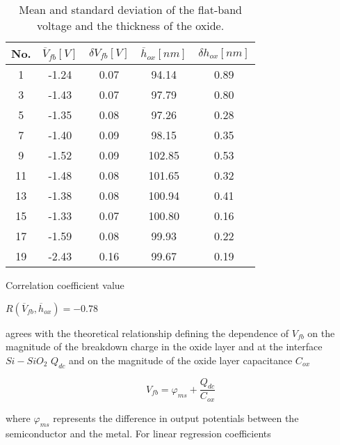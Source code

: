\begin{table}[h!]\centering
  \begin{minipage}[c]{\myfiguresize}
    \begin{center}
      \begin{tabular}{c c c c c}
        No. & $\overline V_{fb} [V]$ & $\delta V_{fb} [V]$ & $\overline h_{ox} [nm]$ & $\delta h_{ox} [nm]$\\
        \hline
        1 & -1.24 & 0.07 & 94.14 & 0.89\\
        3 & -1.43 & 0.07 & 97.79 & 0.80\\
        5 & -1.35 & 0.08 & 97.26 & 0.28\\
        7 & -1.40 & 0.09 & 98.15 & 0.35\\
        9 & -1.52 & 0.09 & 102.85 & 0.53\\
        11 & -1.48 & 0.08 & 101.65 & 0.32\\
        13 & -1.38 & 0.08 & 100.94 & 0.41\\
        15 & -1.33 & 0.07 & 100.80 & 0.16\\
        17 & -1.59 & 0.08 & 99.93 & 0.22\\
        19 & -2.43 & 0.16 & 99.67 & 0.19\\
      \end{tabular}
    \end{center}
    \caption[Mean and standard deviation of the flat-band voltage and
      the thickness of the oxide]{Mean and standard deviation of the
      flat-band voltage and the thickness of the
      oxide.}\label{tab:7.4}
  \end{minipage}
\end{table}

Correlation coefficient value

\centerline{$R(\overline V_{fb} ,\overline h_{ox}) = -0.78$}

agrees with the theoretical relationship defining the dependence of
$V_{fb}$ on the magnitude of the breakdown charge in the oxide layer
and at the interface $Si-SiO_{2}$ $Q_{dc}$ and on the magnitude of the
oxide layer capacitance $C_{ox}$

\begin{equation}\label{eq:7.3}
  V_{fb}  = \varphi_{ms} + \frac{Q_{dc}}{C_{ox}}
\end{equation}

where $\varphi_{ms}$ represents the difference in output potentials
between the semiconductor and the metal. For linear regression
coefficients

